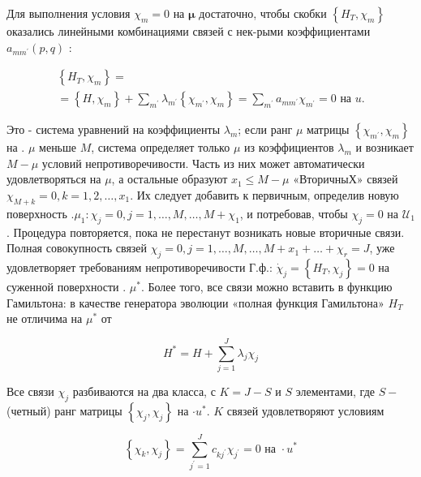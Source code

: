 \documentclass[10pt]{article}
\begin{document}
Для выполнения условия $\chi_{m}=0$ на $\boldsymbol{\mu}$ достаточно, чтобы скобки $\left\{H_{T}, \chi_{m}\right\}$ оказались линейными комбинациями связей с нек-рыми коэффициентами $a_{m m^{\prime}}(p, q)$ :



\[

\begin{gathered}

\left\{H_{T}, \chi_{m}\right\}= \\

=\left\{H, \chi_{m}\right\}+\sum_{m^{\prime}} \lambda_{m^{\prime}}\left\{\chi_{m^{\prime}}, \chi_{m}\right\}=\sum_{m^{\prime}} a_{m m^{\prime}} \chi_{m^{\prime}}=0 \text { на } u .

\end{gathered}

\]



Это - система уравнений на коэффициенты $\lambda_{m}$; если ранг $\mu$ матрицы $\left\{\chi_{m^{\prime}}, \chi_{m}\right\}$ на . $\mu$ меньше $M$, система определяет только $\mu$ из коэффициентов $\lambda_{m}$ и возникает $M-\mu$ условий непротиворечивости. Часть из них может автоматически удовлетворяться на $\mu$, а остальные образуют $x_{1} \leqslant M-\mu$ «ВторичныХ» связей $\chi_{M+k}=0, k=1,2, \ldots, x_{1}$. Их следует добавить к первичным, определив новую поверхность $. \mu_{1}: \chi_{j}=0, j=1, \ldots, M, \ldots, M+\chi_{1}$, и потребовав, чтобы $\chi_{j}=0$ на $\mathscr{U}_{1}$. Процедура повторяется, пока не перестанут возникать новые вторичные связи. Полная совокупность связей $\chi_{j}=0, j=1, \ldots, M, \ldots, M+x_{1}+\ldots+\chi_{r}=J$, уже удовлетворяет требованиям непротиворечивости Г.ф.: $\dot{\chi}_{j}=\left\{H_{T}, \chi_{j}\right\}=0$ на суженной поверхности . $\mu^{*}$. Более того, все связи можно вставить в функцию Гамильтона: в качестве генератора эволюции «полная функция Гамильтона» $H_{T}$ не отличима на $\mu^{*}$ от



\[

H^{*}=H+\sum_{j=1}^{J} \lambda_{j} \chi_{j}

\]



Все связи $\chi_{j}$ разбиваются на два класса, с $K=J-S$ и $S$ элементами, где $S-$ (четный) ранг матрицы $\left\{\chi_{j}, \chi_{j}\right\}$ на $\cdot u^{*}$. $K$ связей удовлетворяют условиям



\[

\left\{\chi_{k}, \chi_{j}\right\}=\sum_{j^{\prime}=1}^{J} c_{k j^{\prime}} \chi_{j^{\prime}}=0 \text { на } \cdot u^{*}

\]
\end{document}
